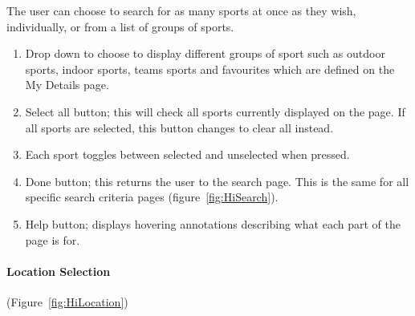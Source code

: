 
The user can choose to search for as many sports at once as they wish,
individually, or from a list of groups of sports.
\begin{enumerate}
	\item Drop down to choose to display different groups of sport such as
		outdoor sports, indoor sports, teams sports and favourites which are
		defined on the My Details page.
	\item Select all button; this will check all sports currently displayed on
		the page. If all sports are selected, this button changes to clear all
		instead.
	\item Each sport toggles between selected and unselected when pressed.
	\item Done button; this returns the user to the search page. This is the
		same for all specific search criteria pages
		(figure~\ref{fig:HiSearch}).
	\item Help button; displays hovering annotations describing what each part
		of the page is for.
\end{enumerate}

\paragraph{Location Selection} (Figure~\ref{fig:HiLocation})


